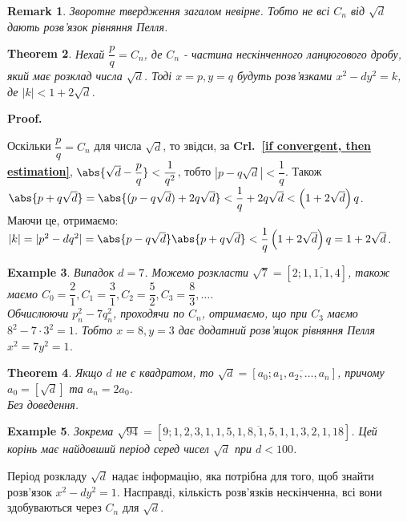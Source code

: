 \documentclass[a4paper, 14pt]{extarticle}
\makeatletter
\theoremstyle{theoremdd}
\newtheorem{theorem}{Theorem}[subsection]
\theoremstyle{theoremdd}
\theoremstyle{theoremdd}
\theoremstyle{theoremdd}
\newtheorem{example}[theorem]{Example}
\theoremstyle{theoremdd}
\theoremstyle{theoremdd}
\newtheorem{remark}[theorem]{Remark}
\theoremstyle{theoremdd}
\theoremstyle{theoremdd}
\def\qed{$\blacksquare$}
\renewenvironment{proof}[1][Proof.\\]{\par
\pushQED{\hfill \qed}%
\normalfont \topsep6\p@\@plus6\p@\relax
\trivlist
\item\relax
{\bfseries
#1\@addpunct{.}}\hspace\labelsep\ignorespaces
}{%
\popQED\endtrivlist\@endpefalse
}
\newcommand\crlref[1]{\textbf{Crl.~\ref{#1}}}
\makeatother
\begin{document}
\begin{remark}
Зворотне твердження загалом невірне. Тобто не всі $C_n$ від $\sqrt{d}$ дають розв'язок рівняння Пелля.
\end{remark}

\begin{theorem}
Нехай $\dfrac{p}{q} = C_n$, де $C_n$ - частина нескінченного ланцюгового дробу, який має розклад числа $\sqrt{d}$. Тоді $x = p, y = q$ будуть розв'язками $x^2 - dy^2 = k$, де $|k| < 1 + 2 \sqrt{d}$.
\end{theorem}

\begin{proof}
Оскільки $\dfrac{p}{q} = C_n$ для числа $\sqrt{d}$, то звідси, за \crlref{if convergent, then estimation}, $\abs{\sqrt{d} - \dfrac{p}{q}} < \dfrac{1}{q^2}$, тобто $|p-q\sqrt{d}| < \dfrac{1}{q}$. Також\\
$\abs{p + q \sqrt{d}} = \abs{(p - q \sqrt{d}) + 2q \sqrt{d}} < \dfrac{1}{q} + 2 q \sqrt{d} < \left( 1 + 2\sqrt{d} \right)q$.\\
Маючи це, отримаємо:\\
$|k| = |p^2 - dq^2| = \abs{p-q \sqrt{d}} \abs{p + q\sqrt{d}} < \dfrac{1}{q} \left(1+2 \sqrt{d} \right)q = 1 + 2 \sqrt{d}$.
\end{proof}

\begin{example}
Випадок $d = 7$. Можемо розкласти $\sqrt{7} = [2; \overline{1,1,1,4}]$, також маємо $C_0 = \dfrac{2}{1}, C_1 = \dfrac{3}{1}, C_2 = \dfrac{5}{2}, C_3 = \dfrac{8}{3}, \dots$.\\
Обчислюючи $p_n^2 - 7q_n^2$, проходячи по $C_n$, отримаємо, що при $C_3$ маємо $8^2 - 7 \cdot 3^2 = 1$. Тобто $x = 8, y = 3$ дає додатний розв'ящок рівняння Пелля $x^2 = 7y^2 = 1$.
\end{example}

\begin{theorem}
Якщо $d$ не є квадратом, то $\sqrt{d} = [a_0; \overline{a_1,a_2,\dots,a_n}]$, причому $a_0 = \left[ \sqrt{d} \right]$ та $a_n = 2a_0$.\\
\textit{Без доведення.}
\end{theorem}

\begin{example}
Зокрема $\sqrt{94} = [9; \overline{1,2,3,1,1,5,1,8,1,5,1,1,3,2,1,18}]$. Цей корінь має найдовший період серед чисел $\sqrt{d}$ при $d < 100$.
\end{example}

Період розкладу $\sqrt{d}$ надає інформацію, яка потрібна для того, щоб знайти розв'язок $x^2 - dy^2 = 1$. Насправді, кількість розв'язків нескінченна, всі вони здобуваються через $C_n$ для $\sqrt{d}$.
\end{document}
